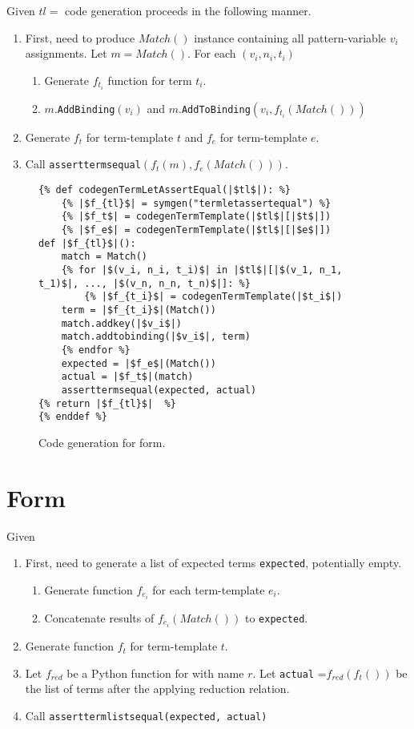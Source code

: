 Given $tl=$ \TermLetAssertEqual code generation proceeds in the following manner.
\begin{enumerate}
\item First, need to produce $Match()$ instance containing all pattern-variable $v_i$ assignments. Let $m=Match()$. For each $(v_i, n_i, t_i)$
	\begin{enumerate}
	\item Generate $f_{t_i}$ function for term $t_i$.
	\item $m$.\texttt{AddBinding}$(v_i)$ and $m$.\texttt{AddToBinding}$(v_i, f_{t_i}(Match()))$
	\end{enumerate}
\item Generate $f_t$ for term-template $t$ and $f_e$ for term-template $e$.
\item Call \texttt{asserttermsequal}$(f_t(m), f_e(Match()))$.
\end{enumerate}

\begin{figure}[h]
\begin{verbatim}
{% def codegenTermLetAssertEqual(|$tl$|): %}
	{% |$f_{tl}$| = symgen("termletassertequal") %}
	{% |$f_t$| = codegenTermTemplate(|$tl$|[|$t$|])
	{% |$f_e$| = codegenTermTemplate(|$tl$|[|$e$|])
def |$f_{tl}$|():
	match = Match()
	{% for |$(v_i, n_i, t_i)$| in |$tl$|[|$(v_1, n_1, t_1)$|, ..., |$(v_n, n_n, t_n)$|]: %}
		{% |$f_{t_i}$| = codegenTermTemplate(|$t_i$|)
	term = |$f_{t_i}$|(Match())
	match.addkey(|$v_i$|)
	match.addtobinding(|$v_i$|, term)
	{% endfor %}
	expected = |$f_e$|(Match())
	actual = |$f_t$|(match)
	asserttermsequal(expected, actual)
{% return |$f_{tl}$|  %}
{% enddef %}
\end{verbatim} 
\caption{Code generation for \TermLetAssertEqualNoArgs \space form.}
\label{codegen-termlet}
\end{figure}


\section{\ApplyReductionRelationAssertEqualNoArgs \space Form}

Given \ApplyReductionRelationAssertEqual
\begin{enumerate}
\item First, need to generate a list of expected terms \texttt{expected}, potentially empty.
	\begin{enumerate}
	\item Generate function $f_{e_i}$ for each term-template $e_i$.
	\item Concatenate results of $f_{e_i}(Match())$ to \texttt{expected}.
	\end{enumerate}
\item Generate function $f_t$ for term-template $t$.
\item Let $f_{red}$ be a Python function for \RedexMatchAssertEqualNoArgs \space with name $r$. Let \texttt{actual} =$f_{red}(f_t())$ be the list of terms after the applying reduction relation.
\item Call \texttt{asserttermlistsequal(expected, actual)}
\end{enumerate}



